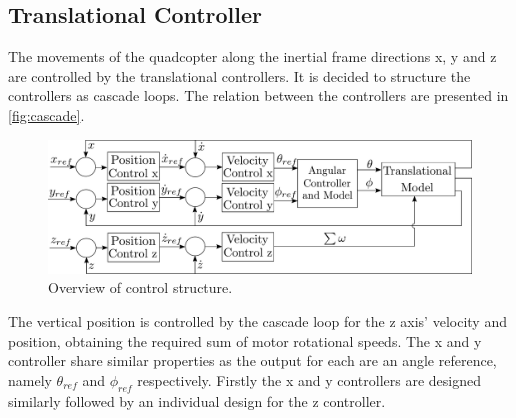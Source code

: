 \subsection{Translational Controller}
The movements of the quadcopter along the inertial frame directions x, y and z are controlled by the translational controllers. It is decided to structure the controllers as cascade loops. The relation between the controllers are presented in \autoref{fig:cascade}.


\begin{figure}[H]
	\centering
	\includegraphics[scale=0.17]{figures/TranslationalControlDiagram.pdf}
	\caption{Overview of control structure.}
	\label{fig:cascade}
\end{figure}
The vertical position is controlled by the cascade loop for the z axis' velocity and position, obtaining the required sum of motor rotational speeds. 
The x and y controller share similar properties as the output for each are an angle reference, namely $\theta_{ref}$ and $\phi_{ref}$ respectively.
Firstly the x and y controllers are designed similarly followed by an individual design for the z controller.\\ 


